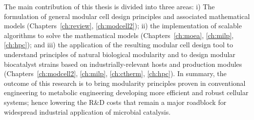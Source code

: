 The main contribution of this thesis is divided into three areas:
i) The formulation of general modular cell design principles and associated mathematical models (Chapters~\ref{ch:review}, \ref{ch:modcell2});
ii) the implementation of scalable algorithms to solve the mathematical models (Chapters~\ref{ch:moea}, \ref{ch:milp}, \ref{ch:hpc});
and iii) the application of the resulting modular cell design tool to understand principles of natural biological modularity and to design modular biocatalyst strains based on industrially-relevant hosts and production modules (Chapters~\ref{ch:modcell2}, \ref{ch:milp}, \ref{ch:ctherm}, \ref{ch:hpc}).
In summary, the outcome of this research is to bring modularity principles proven in conventional engineering to metabolic engineering developing more efficient and robust cellular systems;
hence lowering the R\&D costs that remain a major roadblock for widespread industrial application of microbial catalysis.



